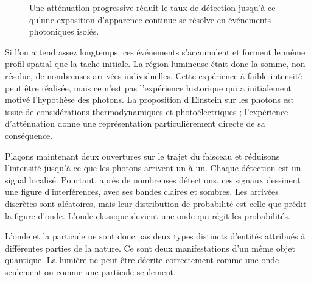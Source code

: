 \begin{figure}[h]\centering
{}\caption{Une atténuation progressive réduit le taux de détection jusqu’à ce qu’une exposition d’apparence continue se résolve en événements photoniques isolés.}\end{figure}

Si l’on attend assez longtemps, ces événements s’accumulent et forment le même profil spatial que la tache initiale. La région lumineuse était donc la somme, non résolue, de nombreuses arrivées individuelles. Cette expérience à faible intensité peut être réalisée, mais ce n’est pas l’expérience historique qui a initialement motivé l’hypothèse des photons. La proposition d’Einstein sur les photons est issue de considérations thermodynamiques et photoélectriques ; l’expérience d’atténuation donne une représentation particulièrement directe de sa conséquence.

Plaçons maintenant deux ouvertures sur le trajet du faisceau et réduisons l’intensité jusqu’à ce que les photons arrivent un à un. Chaque détection est un signal localisé. Pourtant, après de nombreuses détections, ces signaux dessinent une figure d’interférences, avec ses bandes claires et sombres. Les arrivées discrètes sont aléatoires, mais leur distribution de probabilité est celle que prédit la figure d’onde. L’onde classique devient une onde qui régit les probabilités.

L’onde et la particule ne sont donc pas deux types distincts d’entités attribués à différentes parties de la nature. Ce sont deux manifestations d’un même objet quantique. La lumière ne peut être décrite correctement comme une onde seulement ou comme une particule seulement.


